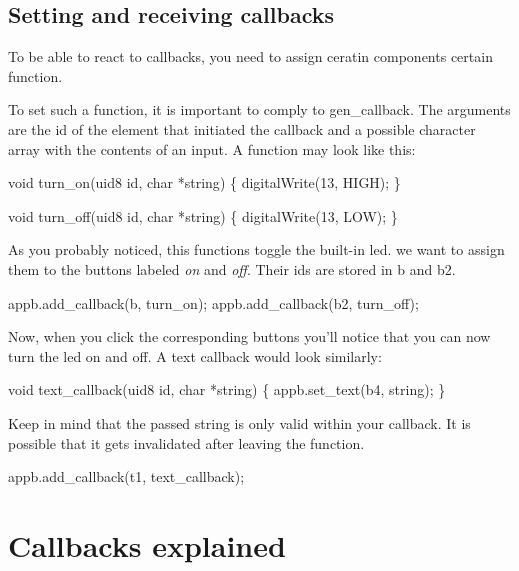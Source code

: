 \subsection*{Setting and receiving callbacks}

To be able to react to callbacks, you need to assign ceratin components certain function.

To set such a function, it is important to comply to {\ttfamily gen\+\_\+callback}. The arguments are the id of the element that initiated the callback and a possible character array with the contents of an input. A function may look like this\+:


\begin{DoxyCode}
\textcolor{keywordtype}{void} turn\_on(uid8 \textcolor{keywordtype}{id}, \textcolor{keywordtype}{char} *\textcolor{keywordtype}{string})
\{
    digitalWrite(13, HIGH);
\}

\textcolor{keywordtype}{void} turn\_off(uid8 \textcolor{keywordtype}{id}, \textcolor{keywordtype}{char} *\textcolor{keywordtype}{string})
\{
    digitalWrite(13, LOW);
\}
\end{DoxyCode}


As you probably noticed, this functions toggle the built-\/in led. we want to assign them to the buttons labeled {\itshape on} and {\itshape off}. Their ids are stored in {\ttfamily b} and {\ttfamily b2}.


\begin{DoxyCode}
appb.add\_callback(b, turn\_on);
appb.add\_callback(b2, turn\_off);
\end{DoxyCode}


Now, when you click the corresponding buttons you'll notice that you can now turn the led on and off. A text callback would look similarly\+:


\begin{DoxyCode}
\textcolor{keywordtype}{void} text\_callback(uid8 \textcolor{keywordtype}{id}, \textcolor{keywordtype}{char} *\textcolor{keywordtype}{string})
\{
    appb.set\_text(b4, \textcolor{keywordtype}{string});
\}
\end{DoxyCode}


Keep in mind that the passed string is only valid within your callback. It is possible that it gets invalidated after leaving the function.


\begin{DoxyCode}
appb.add\_callback(t1, text\_callback);
\end{DoxyCode}


\section*{Callbacks explained}

